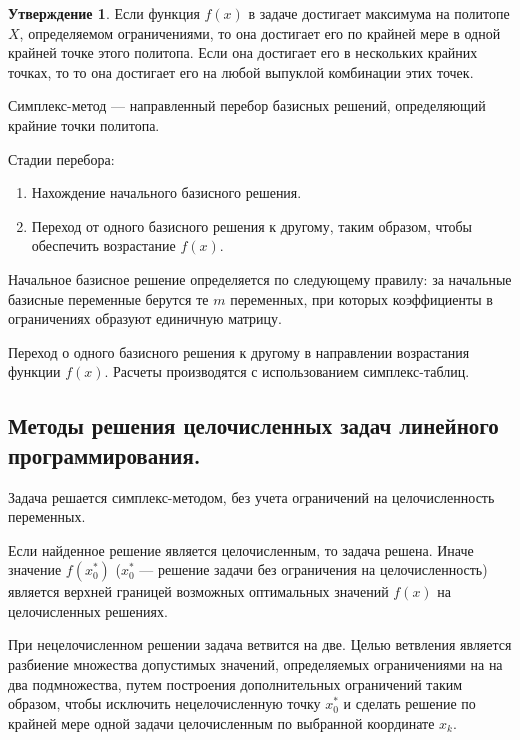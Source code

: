 \documentclass[12pt]{report}
\theoremstyle{definition}
\newtheorem{statement}[theorem]{Утверждение}
\begin{document}
\begin{statement}
Если функция $f(x)$ в задаче достигает максимума на политопе $X$,
определяемом ограничениями, то она достигает его по крайней мере
в одной крайней точке этого политопа. Если она достигает его в нескольких
крайних точках, то то она достигает его на любой выпуклой комбинации этих
точек.
\end{statement}

Симплекс-метод --- направленный перебор базисных решений,
определяющий крайние точки политопа.

Стадии перебора:
\begin{enumerate}
\item Нахождение начального базисного решения.
\item Переход от одного базисного решения к другому, таким образом,
  чтобы обеспечить возрастание $f(x)$.
\end{enumerate}

Начальное базисное решение определяется по следующему правилу:
за начальные базисные переменные берутся те $m$ переменных,
при которых коэффициенты в ограничениях образуют единичную
матрицу.

Переход о одного базисного решения к другому в направлении
возрастания функции $f(x)$. Расчеты производятся с использованием
симплекс-таблиц.

\subsection
{
  Методы решения целочисленных задач линейного программирования.
}

Задача решается симплекс-методом, без учета ограничений на целочисленность переменных.

Если найденное решение является целочисленным, то задача решена.
Иначе значение $f(x^*_0)$ ($x^*_0$ --- решение задачи без ограничения на целочисленность)
является верхней границей возможных оптимальных значений $f(x)$ на целочисленных решениях.

При нецелочисленном решении задача ветвится на две. Целью ветвления является разбиение
множества допустимых значений, определяемых ограничениями на на два подмножества,
путем построения дополнительных ограничений таким образом, чтобы исключить нецелочисленную
точку $x^*_0$ и сделать решение по крайней мере одной задачи целочисленным по выбранной
координате $x_k$.

 
\end{document}
